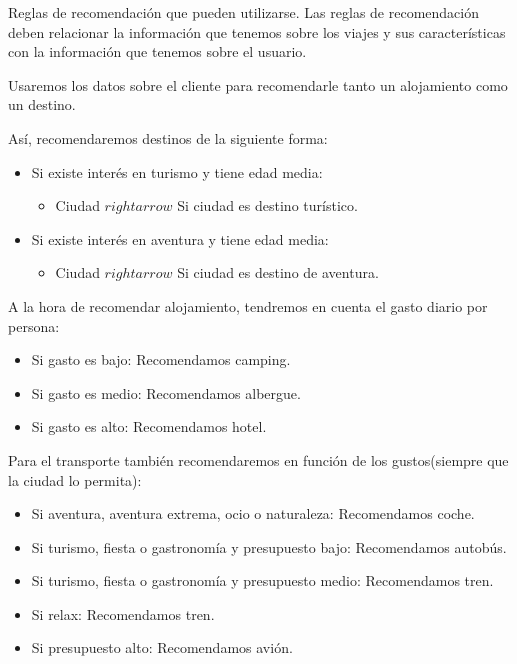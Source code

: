 \documentclass[11pt, a4paper, spanish, openright, twoside]{book}
\begin{document}
		\begin{section}{Reglas de recomendación que pueden utilizarse.}
			Las reglas de recomendación deben relacionar la información que tenemos sobre los viajes y sus características con la información que tenemos 
			sobre el usuario.
			
			
			Usaremos los datos sobre el cliente para recomendarle tanto un alojamiento como un destino. 
			
			Así, recomendaremos destinos de la siguiente forma:
			
				\begin{itemize}
					\item Si existe interés en turismo y tiene edad media:
						\begin{itemize}
							\item Ciudad $rightarrow$  Si ciudad es destino turístico.
						\end{itemize}
					\item Si existe interés en aventura y tiene edad media:
						
						\begin{itemize}
							\item Ciudad $rightarrow$  Si ciudad es destino de aventura.
						\end{itemize}
					
				\end{itemize}
			A la hora de recomendar alojamiento, tendremos en cuenta el gasto diario por persona:
				\begin{itemize}
					\item Si gasto es bajo: Recomendamos camping.
					\item Si gasto es medio: Recomendamos albergue.
					\item Si gasto es alto: Recomendamos hotel.
				\end{itemize}
				
			Para el transporte también recomendaremos en función de los gustos(siempre que la ciudad lo permita):
				\begin{itemize}
					\item Si aventura, aventura extrema, ocio o naturaleza: Recomendamos coche.
					\item Si  turismo, fiesta o gastronomía y presupuesto bajo: Recomendamos autobús.
					\item Si turismo, fiesta o gastronomía y presupuesto medio: Recomendamos tren.
					\item Si relax: Recomendamos tren.
					\item Si presupuesto alto: Recomendamos avión.
				\end{itemize}
				
			
	\end{section}
\end{document}
